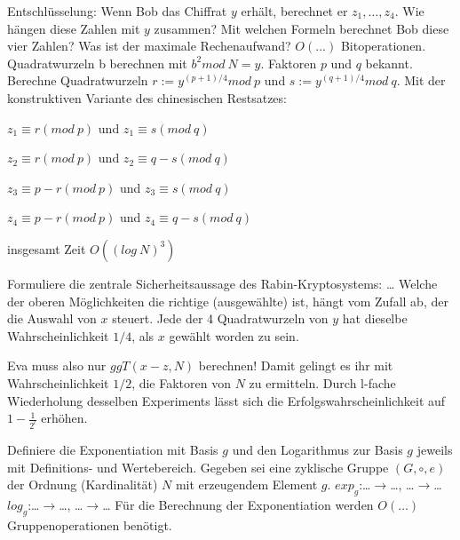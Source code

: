 \documentclass[avery5371, frame]{flashcards}
\begin{document}
\begin{flashcard}{Entschlüsselung: Wenn Bob das Chiffrat $y$ erhält, berechnet er $z_1,\dots, z_4$. Wie hängen diese Zahlen mit $y$ zusammen?
        Mit welchen Formeln berechnet Bob diese vier Zahlen?
        Was ist der maximale Rechenaufwand? $O(...)$ Bitoperationen.}
    Quadratwurzeln b berechnen mit $b^2 mod\ N=y$.
    Faktoren $p$ und $q$ bekannt.
    Berechne Quadratwurzeln $r:=y^{(p+1)/4} mod\ p$ und $s:=y^{(q+1)/4} mod\ q$.
    Mit der konstruktiven Variante des chinesischen Restsatzes:
    \begin{itemize*}
        \item $z_1 \equiv r (mod\ p)$ und $z_1 \equiv s (mod\ q)$
        \item $z_2 \equiv r (mod\ p)$ und $z_2 \equiv q-s (mod\ q)$
        \item $z_3 \equiv p-r (mod\ p)$ und $z_3 \equiv s (mod\ q)$
        \item $z_4 \equiv p-r (mod\ p)$ und $z_4 \equiv q-s (mod\ q)$
    \end{itemize*}


    insgesamt Zeit $O((log\ N)^3)$
\end{flashcard}

\begin{flashcard}{Formuliere die zentrale Sicherheitsaussage des Rabin-Kryptosystems: \dots}
    Welche der oberen Möglichkeiten die richtige (ausgewählte) ist, hängt vom Zufall ab, der die Auswahl von $x$ steuert. Jede der 4 Quadratwurzeln von $y$ hat dieselbe Wahrscheinlichkeit $1/4$, als $x$ gewählt worden zu sein.

    Eva muss also nur $ggT(x-z,N)$ berechnen! Damit gelingt es ihr mit Wahrscheinlichkeit $1/2$, die Faktoren von $N$ zu ermitteln. Durch l-fache Wiederholung desselben Experiments lässt sich die Erfolgswahrscheinlichkeit auf $1-\frac{1}{2^l}$ erhöhen.
\end{flashcard}

\begin{flashcard}{Definiere die Exponentiation mit Basis $g$ und den Logarithmus zur Basis $g$ jeweils mit Definitions- und Wertebereich.}
    Gegeben sei eine zyklische Gruppe $(G,\circ,e)$ der Ordnung (Kardinalität) $N$ mit erzeugendem Element $g$.
    $exp_g$:\dots $\rightarrow$\dots, \dots$\rightarrow$\dots
    $log_g$:\dots $\rightarrow$\dots, \dots$\rightarrow$\dots
    Für die Berechnung der Exponentiation werden $O(\dots)$ Gruppenoperationen benötigt.
\end{flashcard}
\end{document}
